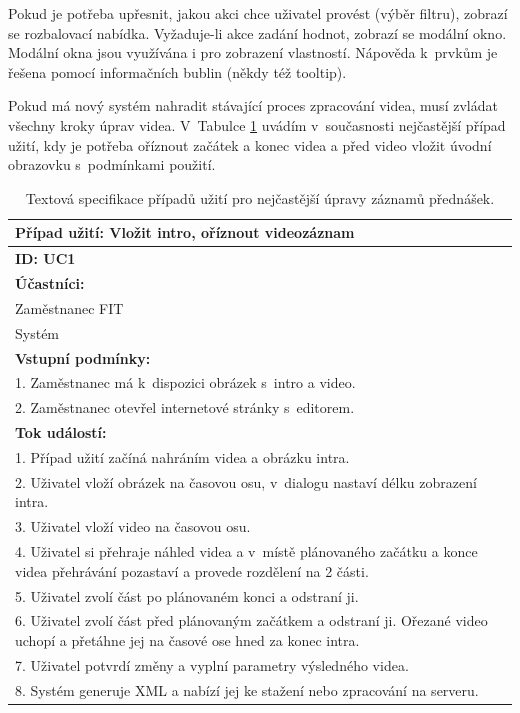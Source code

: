Pokud je potřeba upřesnit, jakou akci chce uživatel provést (výběr filtru), zobrazí se rozbalovací nabídka. Vyžaduje-li akce zadání hodnot, zobrazí se modální okno. Modální okna jsou využívána i pro zobrazení vlastností. Nápověda k~prvkům je řešena pomocí informačních bublin (někdy též tooltip).

Pokud má nový systém nahradit stávající proces zpracování videa, musí zvládat všechny kroky úprav videa. V~Tabulce \ref{tab:uc1} uvádím v~současnosti nejčastější případ užití, kdy je potřeba oříznout začátek a konec videa a před video vložit úvodní obrazovku s~podmínkami použití.

\begin{table}[h]
    \centering
    \begin{tabular}{|p{14cm}|}
        \hline
        Případ užití: Vložit intro, oříznout videozáznam\\ \hline
        \textbf{ID: UC1}\\ \hline
        \textbf{Účastníci:}\\
        Zaměstnanec FIT\\
        Systém\\ \hline
        \textbf{Vstupní podmínky:}\\
        1. Zaměstnanec má k~dispozici obrázek s~intro a video.\\
        2. Zaměstnanec otevřel internetové stránky s~editorem.\\ \hline
        \textbf{Tok událostí:}\\
        1. Případ užití začíná nahráním videa a obrázku intra.\\
        2. Uživatel vloží obrázek na časovou osu, v~dialogu nastaví délku zobrazení intra.\\
        3. Uživatel vloží video na časovou osu.\\
        4. Uživatel si přehraje náhled videa a v~místě plánovaného začátku a konce videa přehrávání pozastaví a provede rozdělení na 2 části.\\
        5. Uživatel zvolí část po plánovaném konci a odstraní ji.\\
        6. Uživatel zvolí část před plánovaným začátkem a odstraní ji. Ořezané video uchopí a přetáhne jej na časové ose hned za konec intra.\\
        7. Uživatel potvrdí změny a vyplní parametry výsledného videa.\\
        8. Systém generuje XML a nabízí jej ke stažení nebo zpracování na serveru.\\
        \hline
    \end{tabular}
    \caption{Textová specifikace případů užití pro nejčastější úpravy záznamů přednášek.}
    \label{tab:uc1}
\end{table}

